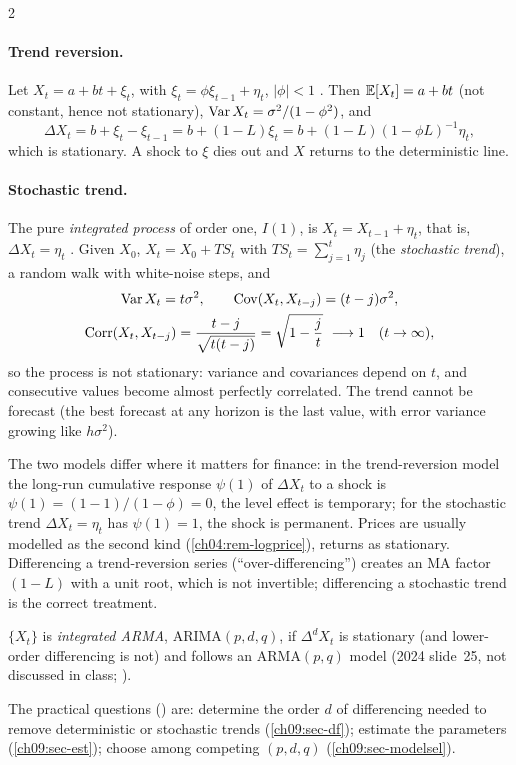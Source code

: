 \begin{paracol}{2}
\paragraph{Trend reversion.} Let $X_t=a+bt+\xi_t$, with $\xi_t=\phi\xi_{t-1}+\eta_t$, $|\phi|<1$
. Then $\mathbb{E}[X_t]=a+bt$ (not constant, hence not stationary), $\operatorname{Var} X_t=\sigma^2/(1-\phi^2)$, and
\[
  \Delta X_t=b+\xi_t-\xi_{t-1}=b+(1-L)\xi_t=b+(1-L)(1-\phi L)^{-1}\eta_t,
\]
which is stationary. A shock to $\xi$ dies out and $X$ returns to the deterministic line.

\paragraph{Stochastic trend.} The pure \emph{integrated process} of order one, $I(1)$, is $X_t=X_{t-1}+\eta_t$, that is,
$\Delta X_t=\eta_t$ . Given $X_0$, $X_t=X_0+TS_t$ with $TS_t=\sum_{j=1}^t\eta_j$ (the
\emph{stochastic trend}), a random walk with white-noise steps, and
\begin{equation}\label{ch09:eq-rwmoments}
  \begin{gathered}
  \Var X_t=t\sigma^2,\qquad \Cov(X_t,X_{t-j})=(t-j)\sigma^2,\\
  \Corr(X_t,X_{t-j})=\frac{t-j}{\sqrt{t(t-j)}}=\sqrt{1-\frac jt}\ \longrightarrow 1\quad(t\to\infty),
  \end{gathered}
\end{equation}
so the process is not stationary: variance and covariances depend on $t$, and consecutive values become
almost perfectly correlated. The trend cannot be forecast (the best forecast at any horizon is the last value, with error
variance growing like $h\sigma^2$).

The two models differ where it matters for finance: in the trend-reversion model the long-run cumulative response
$\psi(1)$ of $\Delta X_t$ to a shock is $\psi(1)=(1-1)/(1-\phi)=0$, the level effect is temporary; for the stochastic trend $\Delta X_t=\eta_t$ has
$\psi(1)=1$, the shock is permanent. Prices are usually modelled as the second kind (\cref{ch04:rem-logprice}),
returns as stationary. Differencing a trend-reversion series (``over-differencing'') creates an MA factor $(1-L)$ with a unit root, which is
not invertible; differencing a stochastic trend is the correct treatment.

\begin{definition}[ARIMA$(p,d,q)$]\label{ch09:def-arima}
$\{X_t\}$ is \emph{integrated ARMA}, ARIMA$(p,d,q)$, if $\Delta^dX_t$ is stationary (and lower-order differencing is not) and
follows an ARMA$(p,q)$ model (2024 slide~25, not discussed in class; ).
\end{definition}
The practical questions () are: determine the order $d$ of differencing needed to remove deterministic or
stochastic trends (\cref{ch09:sec-df}); estimate the parameters (\cref{ch09:sec-est}); choose among competing
$(p,d,q)$ (\cref{ch09:sec-modelsel}).


\end{paracol}
